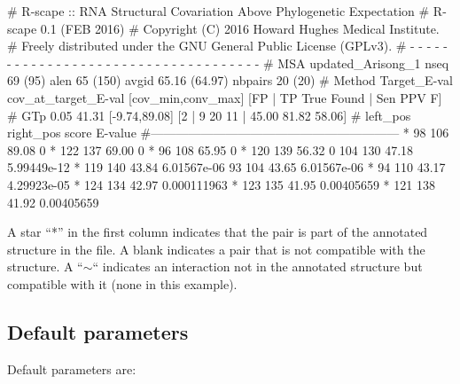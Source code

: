 \begin{sreoutput}
# R-scape :: RNA Structural Covariation Above Phylogenetic Expectation
# R-scape 0.1 (FEB 2016)
# Copyright (C) 2016 Howard Hughes Medical Institute.
# Freely distributed under the GNU General Public License (GPLv3).
# - - - - - - - - - - - - - - - - - - - - - - - - - - - - - - - - - - - -
# MSA updated_Arisong_1 nseq 69 (95) alen 65 (150) avgid 65.16 (64.97) nbpairs 20 (20)
# Method Target_E-val cov_at_target_E-val [cov_min,conv_max] [FP | TP True Found | Sen PPV F] 
# GTp    0.05         41.31               [-9.74,89.08]      [2 | 9 20 11 | 45.00 81.82 58.06] 
#       left_pos       right_pos        score   E-value
#------------------------------------------------------------
*	      98	     106	89.08	0
*	     122	     137	69.00	0
*	      96	     108	65.95	0
*	     120	     139	56.32	0
 	     104	     130	47.18	5.99449e-12
*	     119	     140	43.84	6.01567e-06
 	      93	     104	43.65	6.01567e-06
*	      94	     110	43.17	4.29923e-05
*	     124	     134	42.97	0.000111963
*	     123	     135	41.95	0.00405659
*	     121	     138	41.92	0.00405659
\end{sreoutput}
A star ``*'' in the first column indicates that the pair is part of
the annotated structure in the  file. A
blank indicates a pair that is not compatible with the structure. A
``$\sim$`` indicates an interaction not in the annotated structure but
compatible with it (none in this example).

\subsection{Default parameters}

Default parameters are:


